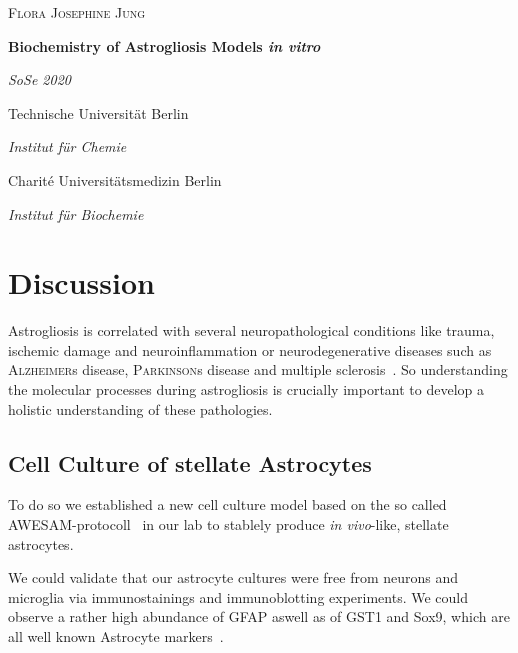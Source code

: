 \documentclass[a4paper,11pt,bibtotocnumbered]{article}
\begin{document}
\begin{titlepage}
	{\scshape\Large Flora Josephine Jung \par}
	\vspace{1.5cm}
	{\huge\bfseries Biochemistry of Astrogliosis Models \textit{in vitro}  \par}
	\vspace{2cm}
	{\Large\itshape SoSe 2020 \par}
	\vspace{2cm}
	{\Large Technische Universität Berlin \par}
	\vspace{.5cm}
	{\Large\itshape Institut für Chemie \par}
	\vspace{2cm}
	{\Large Charité Universitätsmedizin Berlin\par}
	\vspace{.5cm}
	{\Large\itshape Institut für Biochemie \par}
	\vfill
	\date
	\vfill
\end{titlepage}

\pagestyle{plain}
\newpage
{}

\begingroup
\renewcommand*{\thesection}{\Roman{section}}

\newpage
\section{Discussion}

Astrogliosis is correlated with several neuropathological conditions like trauma, ischemic damage and neuroinflammation or neurodegenerative diseases such as \textsc{Alzheimer}s disease, \textsc{Parkinson}s disease and multiple sclerosis~\cite{Pekny2014}. So understanding the molecular processes during astrogliosis is crucially important to develop a holistic understanding of these pathologies. 

\subsection{Cell Culture of stellate Astrocytes}

To do so we established a new cell culture model based on the so called AWESAM-protocoll~\cite{Wolfes2018} in our lab to stablely produce \textit{in vivo}-like, stellate astrocytes. 

We could validate that our astrocyte cultures were free from neurons and microglia via immunostainings and immunoblotting experiments. We could observe a rather high abundance of GFAP aswell as of GST1 and Sox9, which are all well known Astrocyte markers~\cite{Schiweck2018}.
\end{document}
